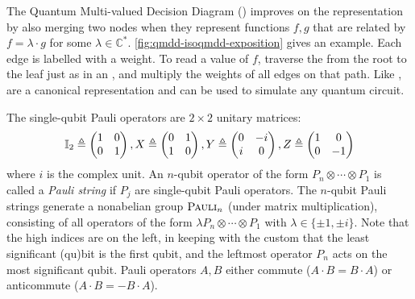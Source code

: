 The Quantum Multi-valued Decision Diagram (\qmdd) \cite{miller2006qmdd} improves on the \add representation by also merging two nodes when they represent functions $f,g$ that are related by $f=\lambda\cdot g$ for some $\lambda\in\mathbb C^{\ast}$.
\autoref{fig:qmdd-isoqmdd-exposition} gives an example.
Each edge is labelled with a weight. %
To read a value of $f$, traverse the \qmdd from the root to the leaf just as in an \add, and multiply the weights of all edges on that path.
Like \adds, \qmdds are a canonical representation and can be used to simulate any quantum circuit.

The single-qubit Pauli operators are
$2\times 2$ unitary matrices:
\begin{equation*}
\id[2] \defn \begin{pmatrix} 1 & 0\\ 0 & 1 \end{pmatrix},
X \defn \begin{pmatrix} 0 & 1\\ 1 & 0 \end{pmatrix},
Y \defn \begin{pmatrix} 0 & -i\\ i & 0 \end{pmatrix},
Z \defn \begin{pmatrix} 1 & 0\\ 0 & -1 \end{pmatrix}
\label{eq:pauli-matrices}
\end{equation*}
where $i$ is the complex unit.
An $n$-qubit operator of the form $P_n\otimes\cdots\otimes P_1$ is called a \emph{Pauli string} if $P_j$ are single-qubit Pauli operators.
The $n$-qubit Pauli strings generate a nonabelian group $\textsc{Pauli}_n$ (under matrix multiplication), consisting of all operators of the form $\lambda P_n\otimes\cdots\otimes P_1$ with $\lambda \in \{\pm 1, \pm i\}$.
Note that the high indices are on the left, in keeping with the custom that the least significant (qu)bit is the first qubit, and the leftmost operator $P_n$ acts on the most significant qubit. 
Pauli operators $A, B$ either commute ($A\cdot B = B\cdot A$) or anticommute ($A \cdot B = - B \cdot A$).


